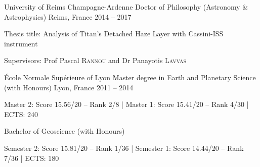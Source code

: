 
\begin{cventries}

  \cventry
    {University of Reims Champagne-Ardenne}
    {Doctor of Philosophy (Astronomy \& Astrophysics)}
    {Reims, France}
    {2014 -- 2017}
    {
      \begin{cvitems}
        \item{Thesis title: Analysis of Titan’s Detached Haze Layer with Cassini-ISS instrument}
        \item{Supervisors: Prof Pascal \textsc{Rannou} and Dr Panayotis \textsc{Lavvas}}
      \end{cvitems}
      \vspace{1em}
    }

  \cventry
    {École Normale Supérieure of Lyon}
    {Master degree in Earth and Planetary Science (with Honours)}
    {Lyon, France}
    {2011 -- 2014}
    {
      \begin{cvitems}
        \item{
            Master 2: Score 15.56/20 -- Rank 2/8 |
            Master 1: Score 15.41/20 -- Rank 4/30 |
            ECTS: 240
        }
      \end{cvitems}
    }

  \cventry
    {}
    {Bachelor of Geoscience (with Honours)}
    {}{}
    {
      \begin{cvitems}
        \item{
            Semester 2: Score 15.81/20 -- Rank 1/36 |
            Semester 1: Score 14.44/20 -- Rank 7/36 |
            ECTS: 180
        }
      \end{cvitems}
    }

\end{cventries}
